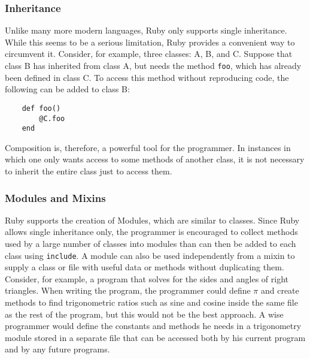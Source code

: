 \documentclass[12pt]{article}
\begin{document}
\subsubsection{Inheritance}
Unlike many more modern languages, Ruby only supports single inheritance\cite{inheritance}. While this seems to be a serious limitation, Ruby provides a convenient way to circumvent it. Consider, for example, three classes: A, B, and C. Suppose that class B has inherited from class A, but needs the method \verb|foo|, which has already been defined in class C. To access this method without reproducing code, the following can be added to class B:
\begin{lstlisting}
    def foo()
        @C.foo
    end
\end{lstlisting}
Composition is, therefore, a powerful tool for the programmer. In instances in which one only wants access to some methods of another class, it is not necessary to inherit the entire class just to access them.

\subsubsection{Modules and Mixins}
Ruby supports the creation of Modules, which are similar to classes\cite{generalRb}. Since Ruby allows single inheritance only, the programmer is encouraged to collect methods used by a large number of classes into modules than can then be added to each class using \verb|include|. A module can also be used independently from a mixin to supply a class or file with useful data or methods without duplicating them. Consider, for example, a program that solves for the sides and angles of right triangles. When writing the program, the programmer could define $\pi$ and create methods to find trigonometric ratios such as sine and cosine inside the same file as the rest of the program, but this would not be the best approach. A wise programmer would define the constants and methods he needs in a trigonometry module stored in a separate file that can be accessed both by his current program and by any future programs\cite{moduletutorial}.
\end{document}
